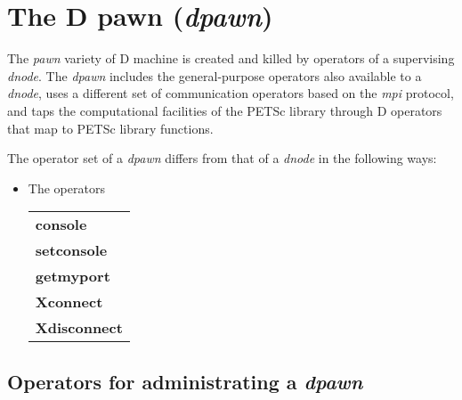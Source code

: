 \section{The D pawn (\emph{dpawn})}

The \emph{pawn} variety of D machine is created and killed by operators of a supervising \emph{dnode}. The \emph{dpawn} includes the general-purpose operators also available to a \emph{dnode}, uses a different set of communication operators based on the \emph{mpi} protocol, and taps the computational facilities of the PETSc library through D operators that map to PETSc library functions.

The operator set of a \emph{dpawn} differs from that of a \emph{dnode} in the following ways:

\begin{itemize}
\item The operators
\begin{tabular}{>{\sffamily\bfseries}l}
console\\
setconsole\\
getmyport \\
Xconnect\\
Xdisconnect\\

\end{tabular}
\end{itemize}


\subsection{Operators for administrating a \emph{dpawn}}

